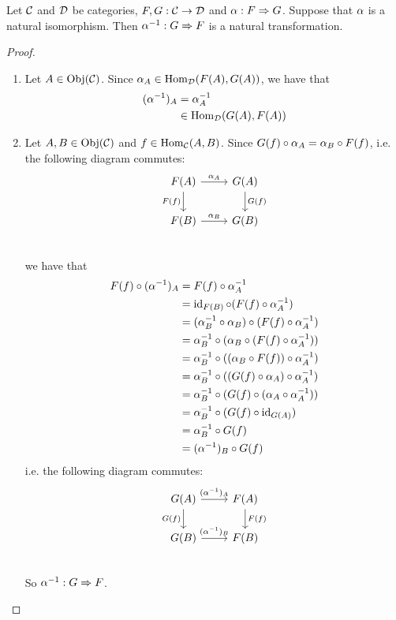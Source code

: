 \documentclass{book}
\begin{document}
	\begin{ex} 
		Let $\mathcal{C}$ and $\mathcal{D}$ be categories, $F,G: \mathcal{C} \rightarrow \mathcal{D}$ and $\alpha : F \Rightarrow G$. Suppose that $\alpha$ is a natural isomorphism. Then $\alpha^{-1}: G \Rightarrow F$ is a natural transformation. 
	\end{ex}
	
	\begin{proof}\
		\begin{enumerate}
			\item Let $A \in \operatorname{Obj}(\mathcal{C})$. Since $\alpha_A \in \operatorname{Hom}_{\mathcal{D}}(F(A), G(A))$, we have that 
			\begin{align*}
				(\alpha^{-1})_A
				& = \alpha_A^{-1} \\
				& \in \operatorname{Hom}_{\mathcal{D}}(G(A), F(A))
			\end{align*}
			\item Let $A, B \in \operatorname{Obj}(\mathcal{C})$ and $f \in \operatorname{Hom}_{\mathcal{C}}(A,B)$. Since $G(f) \circ \alpha_A = \alpha_B \circ F(f)$, i.e. the following diagram commutes:
			\[ 
			\begin{tikzcd}
				F(A)  \arrow[r, "\al_A"]  \arrow[d, "F(f)"']  & G(A)   \arrow[d, "G(f)"]\\
				F(B) \arrow[r, "\al_B"] &  G(B) \\
			\end{tikzcd}
			\]
			we have that 
			\begin{align*}
				F(f) \circ (\alpha^{-1})_A 
				& = F(f) \circ \alpha_A^{-1} \\
				& = \operatorname{id}_{F(B)} \circ (F(f) \circ \alpha_A^{-1}) \\
				& = (\alpha_B^{-1} \circ \alpha_B) \circ (F(f) \circ \alpha_A^{-1}) \\
				& = \alpha_B^{-1} \circ (\alpha_B \circ (F(f) \circ \alpha_A^{-1})) \\
				& = \alpha_B^{-1} \circ ((\alpha_B \circ F(f)) \circ \alpha_A^{-1}) \\
				& = \alpha_B^{-1} \circ ((G(f) \circ \alpha_A) \circ \alpha_A^{-1}) \\
				& = \alpha_B^{-1} \circ (G(f) \circ (\alpha_A \circ \alpha_A^{-1})) \\
				& = \alpha_B^{-1} \circ (G(f) \circ \operatorname{id}_{G(A)}) \\
				& = \alpha_B^{-1} \circ G(f) \\
				& = (\alpha^{-1})_B \circ G(f) 
 			\end{align*}
 			i.e. the following diagram commutes:
 			\[ 
 			\begin{tikzcd}
 				G(A)  \arrow[r, "(\al^{-1})_A"]  \arrow[d, "G(f)"']  & F(A)   \arrow[d, "F(f)"]\\
 				G(B) \arrow[r, "(\al^{-1})_B"] &  F(B) \\
 			\end{tikzcd}
 			\]
 			So $\alpha^{-1}: G \Rightarrow F$.
		\end{enumerate}
	\end{proof}
\end{document}
